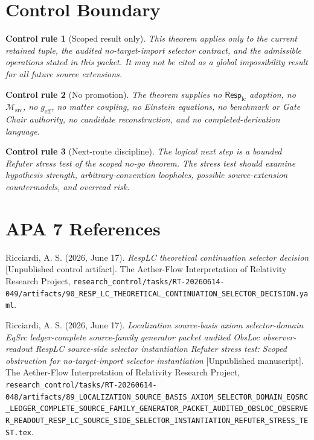 \documentclass[11pt]{article}
\newcommand{\Msrc}{\mathcal{M}_{\mathrm{src}}}
\newcommand{\RespLC}{\mathsf{Resp}_{\mathrm{lc}}}
\newcommand{\geff}{g_{\mathrm{eff}}}
\newtheorem{controlrule}{Control rule}
\begin{document}
\section{Control Boundary}

\begin{controlrule}[Scoped result only]
This theorem applies only to the current retained tuple, the audited
no-target-import selector contract, and the admissible operations
stated in this packet. It may not be cited as a global impossibility
result for all future source extensions.
\end{controlrule}

\begin{controlrule}[No promotion]
The theorem supplies no \(\RespLC\) adoption, no \(\Msrc\), no
\(\geff\), no matter coupling, no Einstein equations, no benchmark or
Gate Chair authority, no candidate reconstruction, and no
completed-derivation language.
\end{controlrule}

\begin{controlrule}[Next-route discipline]
The logical next step is a bounded Refuter stress test of the scoped
no-go theorem. The stress test should examine hypothesis strength,
arbitrary-convention loopholes, possible source-extension
countermodels, and overread risk.
\end{controlrule}

\section*{APA 7 References}

Ricciardi, A. S. (2026, June 17). \emph{RespLC theoretical
continuation selector decision} [Unpublished control artifact]. The
Aether-Flow Interpretation of Relativity Research Project,
\texttt{research\_control/tasks/RT-20260614-049/artifacts/90\_RESP\_LC\_THEORETICAL\_CONTINUATION\_SELECTOR\_DECISION.yaml}.

Ricciardi, A. S. (2026, June 17). \emph{Localization source-basis
axiom selector-domain EqSrc ledger-complete source-family generator
packet audited ObsLoc observer-readout RespLC source-side selector
instantiation Refuter stress test: Scoped obstruction for
no-target-import selector instantiation} [Unpublished manuscript].
The Aether-Flow Interpretation of Relativity Research Project,
\texttt{research\_control/tasks/RT-20260614-048/artifacts/89\_LOCALIZATION\_SOURCE\_BASIS\_AXIOM\_SELECTOR\_DOMAIN\_EQSRC\_LEDGER\_COMPLETE\_SOURCE\_FAMILY\_GENERATOR\_PACKET\_AUDITED\_OBSLOC\_OBSERVER\_READOUT\_RESP\_LC\_SOURCE\_SIDE\_SELECTOR\_INSTANTIATION\_REFUTER\_STRESS\_TEST.tex}.
\end{document}

